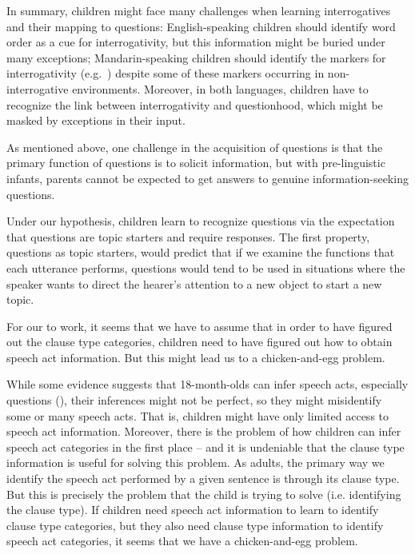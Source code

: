 In summary, children might face many challenges when learning interrogatives and their mapping to questions: English-speaking children should identify word order as a cue for interrogativity, but this information might be buried under many exceptions; Mandarin-speaking children should identify the markers for interrogativity (e.g.~\twh{}) despite some of these markers occurring in non-interrogative environments. Moreover, in both languages, children have to recognize the link between interrogativity and questionhood, which might be masked by exceptions in their input. 


As mentioned above, one challenge in the acquisition of questions is that the primary function of questions is to solicit information, but with pre-linguistic infants, parents cannot be expected to get answers to genuine information-seeking questions. 

Under our hypothesis, children learn to recognize questions via the expectation that questions are topic starters and require responses. The first property, questions as topic starters, would predict that if we examine the functions that each utterance performs, questions would tend to be used in situations where the speaker wants to direct the hearer's attention to a new object to start a new topic. 




For our \subhypos{} to work, it seems that we have to assume that in order to have figured out the clause type categories, children need to have figured out how to obtain speech act information. But this might lead us to a chicken-and-egg problem.

While some evidence suggests that 18-month-olds can infer speech acts, especially questions (\cite{casillas2017turn, marshmallowqueen}), their inferences might not be perfect, so they might misidentify some or many speech acts. That is, children might have only limited access to speech act information. Moreover, there is the problem of how children can infer speech act categories in the first place -- and it is undeniable that the clause type information is useful for solving this problem. As adults, the primary way we identify the speech act performed by a given sentence is through its clause type. But this is precisely the problem that the child is trying to solve (i.e. identifying the clause type). If children need speech act information to learn to identify clause type categories, but they also need clause type information to identify speech act categories, it seems that we have a chicken-and-egg problem. 

